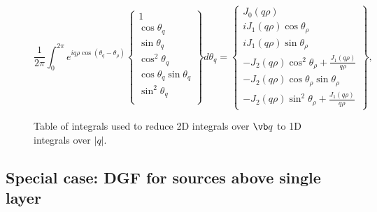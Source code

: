 \documentclass[letterpaper]{article}
\begin{document}
\begin{figure}
$$
 \frac{1}{2\pi} 
 \int_0^{2\pi} e^{i q \rho \cos(\theta_q -\theta_\rho)}
 \left\{\begin{array}{c}
 1 \\[5pt]
 \cos\theta_q \\[5pt]
 \sin\theta_q \\[5pt]
 \cos^2\theta_q \\[5pt]
 \cos\theta_q \sin\theta_q \\[5pt]
 \sin^2\theta_q \\
 \end{array}\right\}
 d\theta_q 
= \left\{ \begin{array}{l}
    J_0 (q\rho)                           \\[5pt]
    i J_1(q\rho) \cos \theta_\rho          \\[5pt]
    i J_1(q\rho) \sin \theta_\rho          \\[5pt]
    - J_2(q\rho) \cos^2\theta_\rho + \frac{J_1(q\rho)}{q\rho} \\[5pt]
    -J_2(q\rho) \cos\theta_\rho \sin \theta_\rho              \\[5pt]
    - J_2(q\rho) \sin^2 \theta_\rho + \frac{J_1(q\rho)}{q\rho} 
  \end{array}\right\},
$$
\caption{Table of integrals used to reduce 2D integrals over $\vb q$ to
         1D integrals over $|q|$.}
\label{BesselIntegralTable}
\end{figure}

\subsection*{Special case: DGF for sources above single layer}
\end{document}
